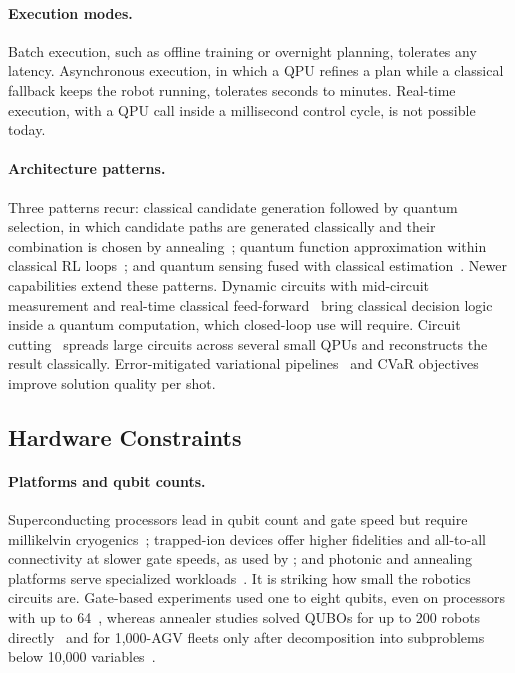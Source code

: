 \documentclass[acmsmall,screen,review]{acmart}
\begin{document}
\paragraph{Execution modes.} Batch execution, such as offline training or overnight planning, tolerates any latency. Asynchronous execution, in which a QPU refines a plan while a classical fallback keeps the robot running, tolerates seconds to minutes. Real-time execution, with a QPU call inside a millisecond control cycle, is not possible today.

\paragraph{Architecture patterns.} Three patterns recur: classical candidate generation followed by quantum selection, in which candidate paths are generated classically and their combination is chosen by annealing~\cite{Clark2019,Ohzeki2019}; quantum function approximation within classical RL loops~\cite{Hohenfeld2024,Dragan2025}; and quantum sensing fused with classical estimation~\cite{Cheiney2018}. Newer capabilities extend these patterns. Dynamic circuits with mid-circuit measurement and real-time classical feed-forward~\cite{Corcoles2021} bring classical decision logic inside a quantum computation, which closed-loop use will require. Circuit cutting~\cite{Tang2021} spreads large circuits across several small QPUs and reconstructs the result classically. Error-mitigated variational pipelines~\cite{Endo2021} and CVaR objectives~\cite{Barkoutsos2020} improve solution quality per shot.


\subsection{Hardware Constraints}\label{sec:hardware}
\paragraph{Platforms and qubit counts.} Superconducting processors lead in qubit count and gate speed but require millikelvin cryogenics~\cite{Kjaergaard2020}; trapped-ion devices offer higher fidelities and all-to-all connectivity at slower gate speeds, as used by \citet{Widdows2023}; and photonic and annealing platforms serve specialized workloads~\cite{Peruzzo2014,Johnson2011}. It is striking how small the robotics circuits are. Gate-based experiments used one to eight qubits, even on processors with up to 64~\cite{Otani2025,Altrabulsi2026,Innan2025}, whereas annealer studies solved QUBOs for up to 200 robots directly~\cite{Clark2019} and for 1,000-AGV fleets only after decomposition into subproblems below 10,000 variables~\cite{Quang2025}.
\end{document}
